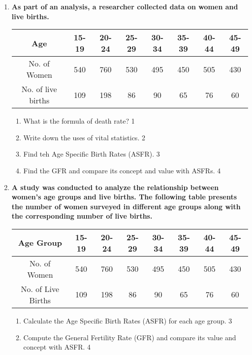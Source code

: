 \documentclass[a4paper,oneside, margin=1.4in]{book}
\begin{document}
\begin{enumerate}
  
  
   \item
	  \textbf{As part of an analysis, a researcher collected data on women and live births.} 
	  \begin{table}[h]
	  \centering
\begin{tabular}{c|c|c|c|c|c|c|c}
Age & 15-19 & 20-24 & 25-29 & 30-34 & 35-39 & 40-44 & 45-49 \\ \hline
No. of Women & 540 & 760 & 530 & 495 & 450 & 505 & 430 \\ \hline
No. of live births & 109 & 198 & 86 & 90 & 65 & 76 & 60
\end{tabular}
\end{table}
  
  \begin{enumerate}
    \item
	What is the formula of death rate? \hfill 1
    \item
	Write down the uses of vital statistics. \hfill 2
    \item  
	Find teh Age Specific Birth Rates (ASFR). \hfill 3
    \item
	Find the GFR and compare its concept and value with ASFRs. \hfill 4
  \end{enumerate}
  
  \item
\textbf{A study was conducted to analyze the relationship between women's age groups and live births. The following table presents the number of women surveyed in different age groups along with the corresponding number of live births.} 

\begin{table}[H]
\centering
\begin{tabular}{c|c|c|c|c|c|c|c}
Age Group & 15-19 & 20-24 & 25-29 & 30-34 & 35-39 & 40-44 & 45-49 \\ \hline
No. of Women & 540 & 760 & 530 & 495 & 450 & 505 & 430 \\
No. of Live Births & 109 & 198 & 86 & 90 & 65 & 76 & 60
\end{tabular}
\end{table}


\begin{enumerate}
    \item
    Calculate the Age Specific Birth Rates (ASFR) for each age group. \hfill 3

    \item
    Compute the General Fertility Rate (GFR) and compare its value and concept with ASFR. \hfill 4
\end{enumerate}


\end{enumerate}
\end{document}
